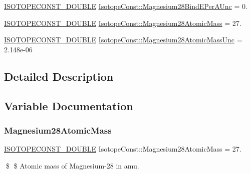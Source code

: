 \begin{DoxyCompactItemize}
\mbox{\hyperlink{group___isotope_const-_macros_ga8f45a7272ce02c0b4c65c44636ed719a}{I\+S\+O\+T\+O\+P\+E\+C\+O\+N\+S\+T\+\_\+\+D\+O\+U\+B\+LE}} \mbox{\hyperlink{group___isotope_const-_magnesium-_mg28_ga9b21d13f8b5e2637c6a1d475082bc071}{Isotope\+Const\+::\+Magnesium28\+Bind\+E\+Per\+A\+Unc}} = 0.
\item 
\mbox{\hyperlink{group___isotope_const-_macros_ga8f45a7272ce02c0b4c65c44636ed719a}{I\+S\+O\+T\+O\+P\+E\+C\+O\+N\+S\+T\+\_\+\+D\+O\+U\+B\+LE}} \mbox{\hyperlink{group___isotope_const-_magnesium-_mg28_ga29e3e44b45d0cdb810f3b79edce27595}{Isotope\+Const\+::\+Magnesium28\+Atomic\+Mass}} = 27.
\item 
\mbox{\hyperlink{group___isotope_const-_macros_ga8f45a7272ce02c0b4c65c44636ed719a}{I\+S\+O\+T\+O\+P\+E\+C\+O\+N\+S\+T\+\_\+\+D\+O\+U\+B\+LE}} \mbox{\hyperlink{group___isotope_const-_magnesium-_mg28_gaed04850790fd845bb917cdb89e6351ff}{Isotope\+Const\+::\+Magnesium28\+Atomic\+Mass\+Unc}} = 2.\+148e-\/06
\end{DoxyCompactItemize}


\subsection{Detailed Description}


\subsection{Variable Documentation}
\mbox{\label{group___isotope_const-_magnesium-_mg28_ga29e3e44b45d0cdb810f3b79edce27595}} 
\subsubsection{\texorpdfstring{Magnesium28\+Atomic\+Mass}{Magnesium28AtomicMass}}
{\footnotesize\ttfamily \mbox{\hyperlink{group___isotope_const-_macros_ga8f45a7272ce02c0b4c65c44636ed719a}{I\+S\+O\+T\+O\+P\+E\+C\+O\+N\+S\+T\+\_\+\+D\+O\+U\+B\+LE}} Isotope\+Const\+::\+Magnesium28\+Atomic\+Mass = 27.}

\$ \$ Atomic mass of Magnesium-\/28 in amu. \mbox{\label{group___isotope_const-_magnesium-_mg28_gaed04850790fd845bb917cdb89e6351ff}} 
